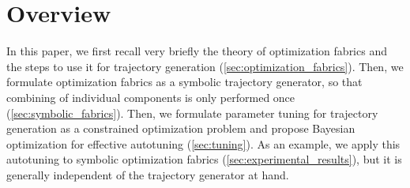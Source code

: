 \section{Overview}
\label{sec:overview}
%
In this paper, we first recall very briefly the theory of optimization fabrics and the steps
to use it for trajectory generation (\cref{sec:optimization_fabrics}). Then, we formulate 
optimization fabrics as a symbolic trajectory generator, so that combining
of individual components is only performed once (\cref{sec:symbolic_fabrics}).
Then, we formulate parameter tuning for trajectory generation as a constrained optimization problem
and propose Bayesian optimization for effective autotuning (\cref{sec:tuning}).  
As an example, we apply this autotuning to symbolic optimization
fabrics (\cref{sec:experimental_results}), but it is generally 
independent of the trajectory generator at hand.
